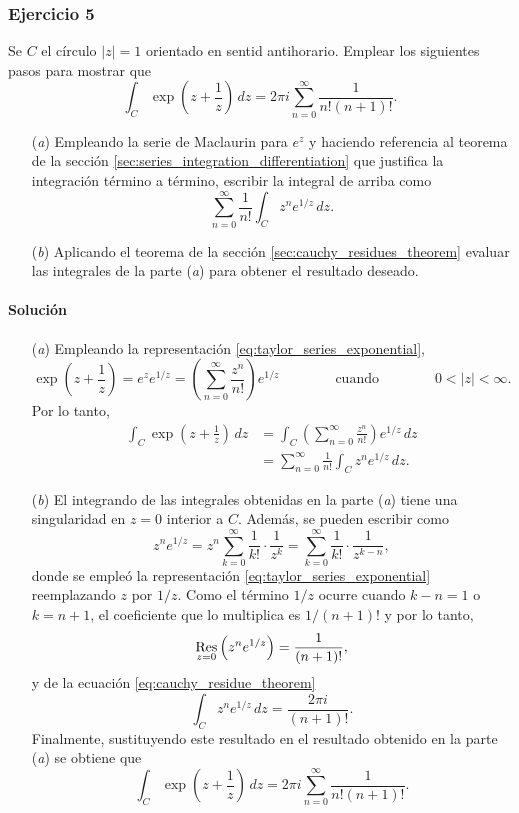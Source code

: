 \documentclass[a4paper]{report}
\def\Res{\qopname\relax m{Res}}
\begin{document}
\subsubsection*{Ejercicio 5}

Se \(C\) el círculo \(|z|=1\) orientado en sentid antihorario. Emplear los siguientes pasos para mostrar que 
\[
 \int_C\exp\left(z+\frac{1}{z}\right)\,dz=2\pi i\sum_{n=0}^\infty\frac{1}{n!(n+1)!}.
\]

\begin{enumerate}
 \item[(\textit{a})] Empleando la serie de Maclaurin para \(e^z\) y haciendo referencia al teorema de la sección \ref{sec:series_integration_differentiation} que justifica la integración término a término, escribir la integral de arriba como
 \[
  \sum_{n=0}^\infty\frac{1}{n!}\int_Cz^ne^{1/z}\,dz.
 \]
 \item[(\textit{b})] Aplicando el teorema de la sección \ref{sec:cauchy_residues_theorem} evaluar las integrales de la parte (\textit{a}) para obtener el resultado deseado.
\end{enumerate}

\paragraph{Solución}

\begin{enumerate}
 \item[(\textit{a})] Empleando la representación \ref{eq:taylor_series_exponential},
 \[
  \exp\left(z+\frac{1}{z}\right)=e^ze^{1/z}=\left(\sum_{n=0}^\infty\frac{z^n}{n!}\right)e^{1/z}
  \qquad\qquad\textrm{cuando}\qquad\qquad
  0<|z|<\infty.
 \]
 Por lo tanto,
 \begin{align*}
  \int_C\exp\left(z+\frac{1}{z}\right)\,dz&=\int_C\left(\sum_{n=0}^\infty\frac{z^n}{n!}\right)e^{1/z}\,dz\\
   &=\sum_{n=0}^\infty\frac{1}{n!}\int_Cz^ne^{1/z}\,dz.
 \end{align*}
 \item[(\textit{b})] El integrando de las integrales obtenidas en la parte (\textit{a}) tiene una singularidad en \(z=0\) interior a \(C\). Además, se pueden escribir como
 \[
  z^ne^{1/z}=z^n\sum_{k=0}^\infty\frac{1}{k!}\cdot\frac{1}{z^k}=\sum_{k=0}^\infty\frac{1}{k!}\cdot\frac{1}{z^{k-n}},
 \]
 donde se empleó la representación \ref{eq:taylor_series_exponential} reemplazando \(z\) por \(1/z\).
 Como el término \(1/z\) ocurre cuando \(k-n=1\) o \(k=n+1\), el coeficiente que lo multiplica es \(1/(n+1)!\) y por lo tanto,
 \[
  \Res_{z=0}\left(z^ne^{1/z}\right)=\frac{1}{(n+1)!},
 \]
 y de la ecuación \ref{eq:cauchy_residue_theorem}
 \[
  \int_Cz^ne^{1/z}\,dz=\frac{2\pi i}{(n+1)!}.
 \]
 Finalmente, sustituyendo este resultado en el resultado obtenido en la parte (\textit{a}) se obtiene que 
\[
 \int_C\exp\left(z+\frac{1}{z}\right)\,dz=2\pi i\sum_{n=0}^\infty\frac{1}{n!(n+1)!}.
\]
\end{enumerate} 
\end{document}

